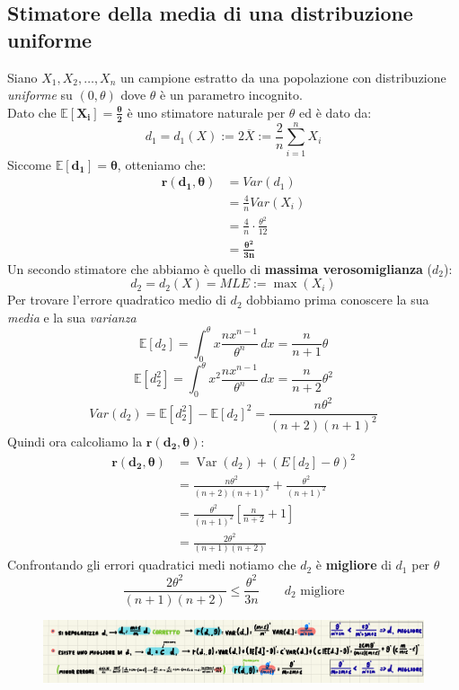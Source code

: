 \documentclass[]{article}
\newcommand{\ev}{\mathbb{E}[X]}
\renewcommand{\ev}[1]{\mathbb{E}\left[#1\right]}
\begin{document}
    \subsection{Stimatore della media di una distribuzione uniforme}
    Siano $X_1, X_2, \ldots, X_n$ un campione estratto da una popolazione con distribuzione \textit{uniforme} su $(0, \theta)$ dove $\theta$ è un parametro incognito. \\
    Dato che $\boldsymbol{\ev{X_i} = \frac{\theta}{2}}$ è uno stimatore naturale per $\theta$ ed è dato da:
    \[ d_1 = d_1 (X) := 2 \overline{X} := \frac{2}{n} \displaystyle\sum_{i=1}^{n} X_i \]
    Siccome $\boldsymbol{\ev{d_1} = \theta}$, otteniamo che:
    \begin{equation*}
        \begin{split}
            \boldsymbol{r(d_1, \theta)} &= Var(d_1) \\
            &= \frac{4}{n} Var(X_i) \\
            &= \frac{4}{n} \cdot \frac{\theta^2}{12} \\
            &= \boldsymbol{\frac{\theta^2}{3n}}
        \end{split}
    \end{equation*}
    Un secondo stimatore che abbiamo è quello di \textbf{massima verosomiglianza} ($d_2$):
    \[ d_2 = d_2(X) = MLE := \max(X_i) \]
    Per trovare l'errore quadratico medio di $d_2$ dobbiamo prima conoscere la sua \textit{media} e la sua \textit{varianza}
    \[ \ev{d_2} = \int_{0}^{\theta} x \frac{nx^{n-1}}{\theta^n} \, dx = \frac{n}{n + 1} \theta \]
    \[ \ev{d^2_2} = \int_{0}^{\theta} x^2 \frac{nx^{n-1}}{\theta^n} \, dx = \frac{n}{n+2} \theta^2 \]
    \[ Var(d_2) = \ev{d^2_2} - \ev{d_2}^2 = \frac{n \theta^2}{(n+2) (n+1)^2} \]
    Quindi ora calcoliamo la $\boldsymbol{r(d_2, \theta)}$:
    \begin{equation}
        \begin{aligned}
        \boldsymbol{r\left(d_2, \theta\right)} & =\operatorname{Var}\left(d_2\right)+\left(E\left[d_2\right]-\theta\right)^2 \\
        & =\frac{n \theta^2}{(n+2)(n+1)^2}+\frac{\theta^2}{(n+1)^2} \\
        & =\frac{\theta^2}{(n+1)^2}\left[\frac{n}{n+2}+1\right] \\
        & =\frac{2 \theta^2}{(n+1)(n+2)}
        \end{aligned}
    \end{equation}
    Confrontando gli errori quadratici medi notiamo che $d_2$ è \textbf{migliore} di $d_1$ per $\theta$
    \[ \frac{2 \theta^2}{(n+1)(n+2)} \leq \frac{\theta^2}{3n} \qquad \text{$d_2$ migliore} \]
    \begin{figure}[H]
        \includegraphics[width=\textwidth]{images/boh_5.png}
    \end{figure}
\end{document}
